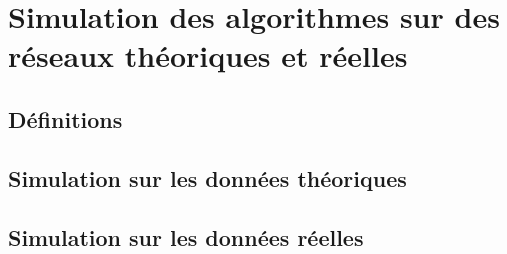 
\chapter{Simulation des algorithmes sur des r\'eseaux th\'eoriques et r\'eelles}

\section{D\'efinitions}
	

\section{Simulation sur les donn\'ees th\'eoriques}
	

\section{Simulation sur les donn\'ees r\'eelles}
	


